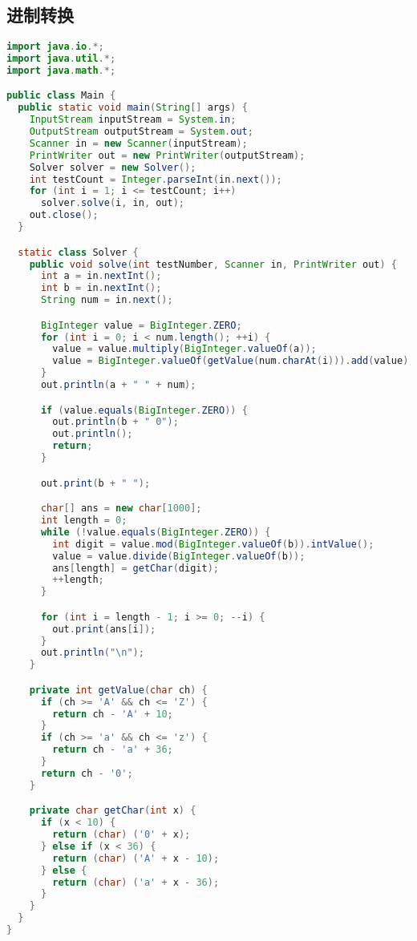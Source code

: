 \subsection{进制转换}
\begin{lstlisting}[language=java]
import java.io.*;
import java.util.*;
import java.math.*;

public class Main {
  public static void main(String[] args) {
    InputStream inputStream = System.in;
    OutputStream outputStream = System.out;
    Scanner in = new Scanner(inputStream);
    PrintWriter out = new PrintWriter(outputStream);
    Solver solver = new Solver();
    int testCount = Integer.parseInt(in.next());
    for (int i = 1; i <= testCount; i++)
      solver.solve(i, in, out);
    out.close();
  }

  static class Solver {
    public void solve(int testNumber, Scanner in, PrintWriter out) {
      int a = in.nextInt();
      int b = in.nextInt();
      String num = in.next();

      BigInteger value = BigInteger.ZERO;
      for (int i = 0; i < num.length(); ++i) {
        value = value.multiply(BigInteger.valueOf(a));
        value = BigInteger.valueOf(getValue(num.charAt(i))).add(value);
      }
      out.println(a + " " + num);

      if (value.equals(BigInteger.ZERO)) {
        out.println(b + " 0");
        out.println();
        return;
      }

      out.print(b + " ");

      char[] ans = new char[1000];
      int length = 0;
      while (!value.equals(BigInteger.ZERO)) {
        int digit = value.mod(BigInteger.valueOf(b)).intValue();
        value = value.divide(BigInteger.valueOf(b));
        ans[length] = getChar(digit);
        ++length;
      }

      for (int i = length - 1; i >= 0; --i) {
        out.print(ans[i]);
      }
      out.println("\n");
    }

    private int getValue(char ch) {
      if (ch >= 'A' && ch <= 'Z') {
        return ch - 'A' + 10;
      }
      if (ch >= 'a' && ch <= 'z') {
        return ch - 'a' + 36;
      }
      return ch - '0';
    }

    private char getChar(int x) {
      if (x < 10) {
        return (char) ('0' + x);
      } else if (x < 36) {
        return (char) ('A' + x - 10);
      } else {
        return (char) ('a' + x - 36);
      }
    }
  }
}
\end{lstlisting}
